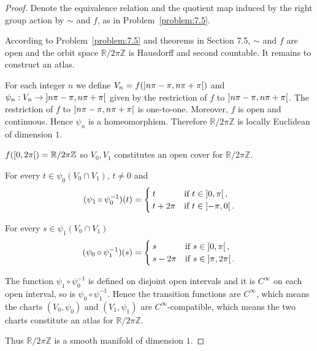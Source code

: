 \begin{proof}
	Denote the equivalence relation and the quotient map induced by the right group action by \( \sim \) and \( f \), as in Problem~\ref{problem:7.5}.

	According to Problem~\ref{problem:7.5} and theorems in Section 7.5, \( \sim \) and \( f \) are open and the orbit space \( \mathbb{R}/2\pi\mathbb{Z} \) is Hausdorff and second countable. It remains to construct an atlas.

	For each integer \(n\) we define \( V_{n} = f(\left]{n\pi - \pi, n\pi + \pi}\right[) \) and \( \psi_{n}: V_{n} \to \left]{n\pi - \pi, n\pi + \pi}\right[ \) given by the restriction of \( f \) to \( \left]{n\pi - \pi, n\pi + \pi}\right[ \). The restriction of \( f \) to \( \left]{n\pi - \pi, n\pi + \pi}\right[ \) is one-to-one. Moreover, \( f \) is open and continuous. Hence \( \psi_{n} \) is a homeomorphism. Therefore \( \mathbb{R}/2\pi\mathbb{Z} \) is locally Euclidean of dimension \(1\).

	\( f(\left[{0, 2\pi}\right[) = \mathbb{R}/2\pi\mathbb{Z} \) so \( V_{0}, V_{1} \) constitutes an open cover for \( \mathbb{R}/2\pi\mathbb{Z} \).

	For every \( t \in \psi_{0}(V_{0} \cap V_{1}) \), \( t \ne 0 \) and
	\[
		(\psi_{1} \circ \psi_{0}^{-1})(t) = \begin{cases}
			t        & \text{if } t\in \left]{0, \pi}\right[,  \\
			t + 2\pi & \text{if } t\in \left]{-\pi, 0}\right[.
		\end{cases}
	\]

	For every \( s \in \psi_{1}(V_{0} \cap V_{1}) \)
	\[
		(\psi_{0} \circ \psi_{1}^{-1})(s) = \begin{cases}
			s        & \text{if } s\in \left]{0, \pi}\right[,    \\
			s - 2\pi & \text{if } s\in \left]{\pi, 2\pi}\right[.
		\end{cases}
	\]

	The function \( \psi_{1}\circ \psi_{0}^{-1} \) is defined on disjoint open intervals and it is \( C^{\infty} \) on each open interval, so is \( \psi_{0} \circ \psi_{1}^{-1} \). Hence the transition functions are \( C^{\infty} \), which means the charts \( (V_{0}, \psi_{0}) \) and \( (V_{1}, \psi_{1}) \) are \( C^{\infty} \)-compatible, which means the two charts constitute an atlas for \( \mathbb{R}/2\pi\mathbb{Z} \).

	Thus \( \mathbb{R}/2\pi\mathbb{Z} \) is a smooth manifold of dimension \(1\).
\end{proof}

